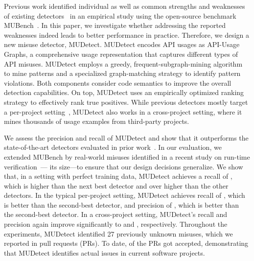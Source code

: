 %

Previous work identified individual as well as common strengths and weaknesses of existing detectors~\cite{ANNN+17} in an empirical study using the open-source benchmark MUBench~\cite{mubench}.
In this paper, we investigate whether addressing the reported weaknesses indeed leads to better performance in practice. 
Therefore, we design a new misuse detector, MUDetect. 
MUDetect encodes API usages as API-Usage Graphs, a comprehensive usage representation that captures different types of API misuses.
MUDetect employs a greedy, frequent-subgraph-mining algorithm to mine patterns and a specialized graph-matching strategy to identify pattern violations. %
Both components consider code semantics to improve the overall detection capabilities.
On top, MUDetect uses an empirically optimized ranking strategy to effectively rank true positives.
While previous detectors mostly target a per-project setting~\cite{ANNN+17}, MUDetect also works in a cross-project setting, where it mines thousands of usage examples from third-party projects.

We assess the precision and recall of MUDetect and show that it outperforms the  state-of-the-art detectors evaluated in prior work~\cite{ANNN+17}.
In our evaluation, we extended MUBench by  real-world misuses identified in a recent study on run-time verification~\cite{LHXRM16}--- its size---to ensure that our design decisions generalize.
%
We show that, in a setting with perfect training data, MUDetect achieves a recall of , which is  higher than the next best detector and over  higher than the other detectors.
In the typical per-project setting, MUDetect achieves recall of , which is  better than the second-best detector, and precision of , which is  better than the second-best detector.
In a cross-project setting, MUDetect's recall and precision again improve significantly to  and , respectively.
%
Throughout the experiments, MUDetect identified 27 previously unknown misuses, which we reported in  pull requests (PRs).
To date,  of the PRs got accepted, demonstrating that MUDetect identifies actual issues in current software projects.


